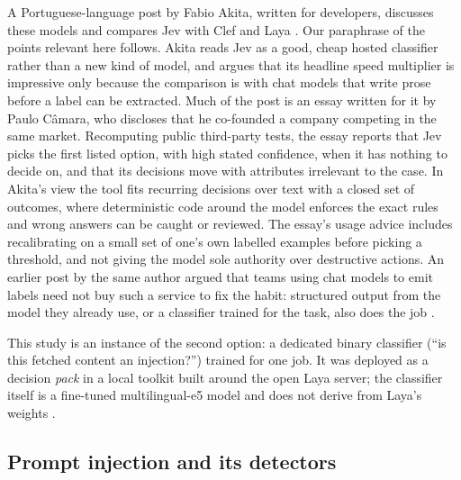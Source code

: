 \documentclass[11pt]{article}
\begin{document}
A Portuguese-language post by Fabio Akita, written for developers, discusses these models and compares Jev with Clef and Laya \citep{akita2026jev}. Our paraphrase of the points relevant here follows. Akita reads Jev as a good, cheap hosted classifier rather than a new kind of model, and argues that its headline speed multiplier is impressive only because the comparison is with chat models that write prose before a label can be extracted. Much of the post is an essay written for it by Paulo Câmara, who discloses that he co-founded a company competing in the same market. Recomputing public third-party tests, the essay reports that Jev picks the first listed option, with high stated confidence, when it has nothing to decide on, and that its decisions move with attributes irrelevant to the case. In Akita's view the tool fits recurring decisions over text with a closed set of outcomes, where deterministic code around the model enforces the exact rules and wrong answers can be caught or reviewed. The essay's usage advice includes recalibrating on a small set of one's own labelled examples before picking a threshold, and not giving the model sole authority over destructive actions. %
An earlier post by the same author argued that teams using chat models to emit labels need not buy such a service to fix the habit: structured output from the model they already use, or a classifier trained for the task, also does the job \citep{akita2026typesafe}. %

This study is an instance of the second option: a dedicated binary classifier (``is this fetched content an injection?'') trained for one job. It was deployed as a decision \emph{pack} in a local toolkit built around the open Laya server; the classifier itself is a fine-tuned multilingual-e5 model and does not derive from Laya's weights%
.

\subsection{Prompt injection and its detectors}\label{sec:2.2}
\end{document}
